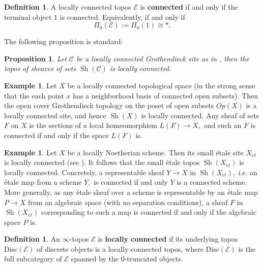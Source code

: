 \documentclass[12pt]{amsart}
\newtheorem{proposition}[dummy]{Proposition}
\theoremstyle{definition}
\newtheorem{definition}[dummy]{Definition}
\newtheorem{example}[dummy]{Example}
\newcommand{\cE}{\mathcal{E}}
\newcommand{\sC}{\mathscr{C}}
\newcommand{\Sh}{\operatorname{Sh}}
\newcommand{\et}{\acute{e}t}
\renewcommand{\i}{\infty}
\def\Disc{\mbox{Disc}}
\begin{document}
\begin{definition}
A locally connected topos $\cE$ is \textbf{connected} if and only if the terminal object $1$ is connected. Equivalently, if and only if $$\Pi_0\left(\cE\right):=\Pi_0\left(1\right)\cong *.$$
\end{definition}

The following proposition is standard:

\begin{proposition}
Let $\sC$ be a locally connected Grothendieck site as in \cite[Section 9]{ArtinMazur}, then the topos of sheaves of sets $\Sh\left(\sC\right)$ is locally connected.
\end{proposition}

\begin{example}
Let $X$ be a locally connected topological space (in the strong sense that the each point $x$ has a neighborhood basis of connected open subsets). Then the open cover Grothendieck topology on the poset of open subsets $Op\left(X\right)$ is a locally connected site, and hence $\Sh\left(X\right)$ is locally connected. Any sheaf of sets $F$ on $X$ is the sections of a local homeomorphism $L\left(F\right) \to X,$ and such an $F$ is connected if and only if the space $L\left(F\right)$ is.
\end{example}

\begin{example}
Let $X$ be a locally Noetherian scheme. Then its small \'etale site $X_{\et}$ is locally connected (see \cite[I 6.1.9]{EGA1}). It follows that the small \'etale topos $\Sh\left(X_{\et}\right)$ is locally connected. Concretely, a representable sheaf $Y \to X$ in $\Sh\left(X_{\et}\right),$ i.e. an \'etale map from a scheme $Y,$ is connected if and only $Y$ is a connected scheme. More generally, as any \'etale sheaf over a scheme is representable by an \'etale map $P \to X$ from an algebraic space (with no separation conditions), a sheaf $F$ in $\Sh\left(X_{\et}\right)$ corresponding to such a map is connected if and only if the algebraic space $P$ is.
\end{example}

\begin{definition}
An $\i$-topos $\cE$ is \textbf{locally connected} if its underlying topos $\Disc\left(\cE\right)$ of discrete objects is a locally connected topos, where $\Disc\left(\cE\right)$ is the full subcategory of $\cE$ spanned by the $0$-truncated objects.
\end{definition}
\end{document}
